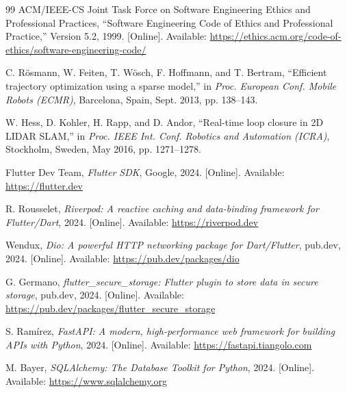 \documentclass[12pt,a4paper]{report}
\begin{document}
\begin{singlespace}
\begin{thebibliography}{99}
ACM/IEEE-CS Joint Task Force on Software Engineering Ethics and Professional Practices, ``Software Engineering Code of Ethics and Professional Practice,'' Version 5.2, 1999. [Online]. Available: \url{https://ethics.acm.org/code-of-ethics/software-engineering-code/}


C. R{\"o}smann, W. Feiten, T. W{\"o}sch, F. Hoffmann, and T. Bertram, ``Efficient trajectory optimization using a sparse model,'' in \textit{Proc. European Conf. Mobile Robots (ECMR)}, Barcelona, Spain, Sept. 2013, pp. 138--143.

W. Hess, D. Kohler, H. Rapp, and D. Andor, ``Real-time loop closure in 2D LIDAR SLAM,'' in \textit{Proc. IEEE Int. Conf. Robotics and Automation (ICRA)}, Stockholm, Sweden, May 2016, pp. 1271--1278.




Flutter Dev Team,
\textit{Flutter SDK},
Google, 2024. [Online]. Available: \url{https://flutter.dev}

R. Rousselet,
\textit{Riverpod: A reactive caching and data-binding framework for Flutter/Dart},
2024. [Online]. Available: \url{https://riverpod.dev}

Wendux,
\textit{Dio: A powerful HTTP networking package for Dart/Flutter},
pub.dev, 2024. [Online]. Available: \url{https://pub.dev/packages/dio}

G. Germano,
\textit{flutter\_secure\_storage: Flutter plugin to store data in secure storage},
pub.dev, 2024. [Online]. Available: \url{https://pub.dev/packages/flutter_secure_storage}


S. Ram\'{i}rez,
\textit{FastAPI: A modern, high-performance web framework for building APIs with Python},
2024. [Online]. Available: \url{https://fastapi.tiangolo.com}

M. Bayer,
\textit{SQLAlchemy: The Database Toolkit for Python},
2024. [Online]. Available: \url{https://www.sqlalchemy.org}


\end{thebibliography}
\end{singlespace}
\end{document}
